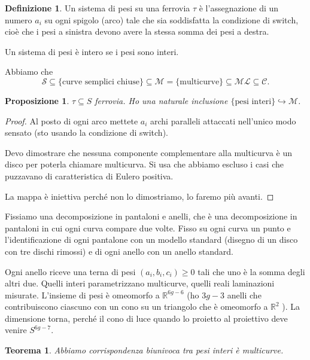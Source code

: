 \documentclass[a4paper]{article}
\newtheorem{theorem}{Teorema}
\newtheorem{proposition}{Proposizione}
\theoremstyle{definition}
\newtheorem{definition}{Definizione}
\begin{document}
    \begin{definition}
        Un sistema di pesi su una ferrovia $\tau$ è l'assegnazione di un numero $a_i$ su ogni spigolo (arco) tale che sia soddisfatta la condizione di switch, cioè che i pesi a sinistra devono avere la stessa somma dei pesi a destra.

        Un sistema di pesi è intero se i pesi sono interi.
    \end{definition}

    Abbiamo che \[
        \mathcal S \subseteq \{\mbox{curve semplici chiuse}\} \subseteq \mathcal M = \{\mbox{multicurve}\} \subseteq \mathcal{ML} \subseteq \mathcal C.
    \]
    \begin{proposition}
        $\tau\subseteq S$ ferrovia. Ho una naturale inclusione $\{\mbox{pesi interi}\} \hookrightarrow \mathcal M$.
    \end{proposition}

    \begin{proof}
        Al posto di ogni arco mettete $a_i$ archi paralleli attaccati nell'unico modo sensato (sto usando la condizione di switch).

        Devo dimostrare che nessuna componente complementare alla multicurva è un disco per poterla chiamare multicurva. Si usa che abbiamo escluso i casi che puzzavano di caratteristica di Eulero positiva.

        La mappa è iniettiva perché non lo dimostriamo, lo faremo più avanti.
    \end{proof} 

    Fissiamo una decomposizione in pantaloni e anelli, che è una decomposizione in pantaloni in cui ogni curva compare due volte. Fisso su ogni curva un punto e l'identificazione di ogni pantalone con un modello standard (disegno di un disco con tre dischi rimossi) e di ogni anello con un anello standard.

    Ogni anello riceve una terna di pesi $(a_i, b_i, c_i) \geq 0$ tali che uno è la somma degli altri due. Quelli interi parametrizzano multicurve, quelli reali laminazioni misurate.
    L'insieme di pesi è omeomorfo a $\mathbb R^{6 g - 6}$ (ho $3 g - 3$ anelli che contribuiscono ciascuno con un cono su un triangolo che è omeomorfo a $\mathbb R^2$ ). La dimensione torna, perché il cono di luce quando lo proietto al proiettivo deve venire $S^{6 g - 7}$.
     
    \begin{theorem}
        Abbiamo corrispondenza biunivoca tra pesi interi è multicurve.
    \end{theorem}
\end{document}
